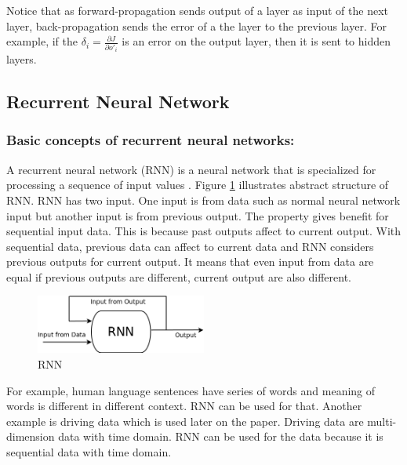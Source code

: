 \documentclass[draft,dvipsnames]{drexel-thesis}
\begin{document}
\begin{thesis}
Notice that as forward-propagation sends output of a layer as input of the next layer, back-propagation sends the error of a the layer to the previous layer. For example, if the $\delta_i=\frac{\partial J}{\partial o'_i}$ is an error on the output layer, then it is sent to hidden layers.




\subsection{Recurrent Neural Network}\label{subsec:RNN}

\subsubsection{Basic concepts of recurrent neural networks:}\label{basicRNN}
	A recurrent neural network (RNN) is a neural network that is specialized for processing a sequence of input values \cite{Goodfellow-et-al-2016}. Figure \ref{fig:RNN} illustrates abstract structure of RNN. RNN has two input. One input is from data such as normal neural network input but another input is from previous output. The property gives benefit for sequential input data. This is because past outputs affect to current output. With sequential data, previous data can affect to current data and RNN considers previous outputs for current output. It means that even input from data are equal if previous outputs are different, current output are also different.

\begin{figure}[t!]
    \centering
    \includegraphics[width=0.5\textwidth]{pictures/figures/RNN.png}
    \caption{RNN}
    \label{fig:RNN}
\end{figure}

	For example, human language sentences have series of words and meaning of words is different in different context. RNN can be used for that. Another example is driving data which is used later on the paper.  Driving data are multi-dimension data with time domain. RNN can be used for the data because it is sequential data with time domain.


\end{thesis}
\end{document}

